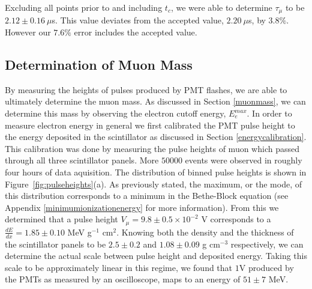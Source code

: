 Excluding all points prior to and including $t_{c}$, we were able to determine $\tau_{\mu}$ to be $2.12 \pm 0.16~\mu$s.  This value deviates from the accepted value, $2.20~\mu$s, by $3.8\%$.  However our $7.6\%$ error includes the accepted value.






\subsection{Determination of Muon Mass}\label{determinationofmuonmass}

By measuring the heights of pulses produced by PMT flashes, we are
able to ultimately determine the muon mass.  As discussed in Section
\ref{muonmass}, we can determine this mass by observing the electron cutoff energy, $E_{e}^{max}$. In order to measure electron energy in general
we first calibrated the PMT pulse height to the energy deposited in
the scintillator as discussed in Section \ref{energycalibration}. This calibration
was done by measuring the pulse heights of muon which passed through
all three scintillator panels.  More $50000$ events were observed in
roughly four hours of data aquisition.  The distribution of binned
pulse heights is shown in Figure~\ref{fig:pulseheights}(a).  As previously stated, the
maximum, or the mode, of this distribution corresponds to a minimum in
the Bethe-Block equation (see Appendix \ref{minimumionizationenergy} for more information).  From this we determined that a pulse
height $V_{\mu} = 9.8\pm0.5 \times 10^{-2}$ V corresponds to a $\frac{dE}{dx}= 1.85\pm0.10$ MeV
g$^{-1}$ cm$^{2}$.  Knowing both the density and the thickness of the
scintillator panels to be $2.5\pm0.2$ and $1.08\pm0.09$ g cm$^{-3}$ respectively, we can determine
the actual scale between pulse height and deposited energy.  Taking
this scale to be approximately linear in this regime, we found that
$1$V produced by the PMTs as measured by an oscilloscope, maps to an
energy of $51 \pm 7$ MeV.



